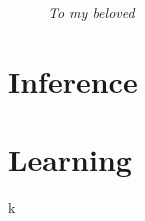 \documentclass[g5paper,phd,electronic]{kthesis}
\begin{document}
\frontmatter
\maketitle
\thispagestyle{empty}
\vfill
\begin{figure}
\begin{flushright}
\Large
\textit{To my beloved}
\end{flushright}
\end{figure}
\vfill







\tableofcontents


\mainmatter





\part{Inference}





\part{Learning}
\label{part:learning}
% 

% 

% 

% 
k



\end{document}
